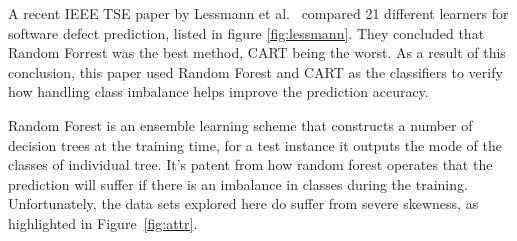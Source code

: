 \documentclass[12pt]{IEEEtran}
\begin{document}
A recent IEEE TSE paper by Lessmann et al.~\cite{lessmann} compared 21 different learners for software defect prediction, listed in figure \ref{fig:lessmann}. They concluded that Random Forrest was the best method, CART being the worst. As a result of this conclusion, this paper used Random Forest and CART as the classifiers to verify how handling class imbalance helps improve the prediction accuracy.

Random Forest is an ensemble learning scheme that constructs a number of decision trees at the training time, for a test instance it outputs the mode of the classes of individual tree. It's patent from how random forest operates that the prediction will suffer if there is an imbalance in classes during the training. Unfortunately, the data sets explored here do suffer from severe skewness, as highlighted in Figure~\ref{fig:attr}. 
\end{document}
